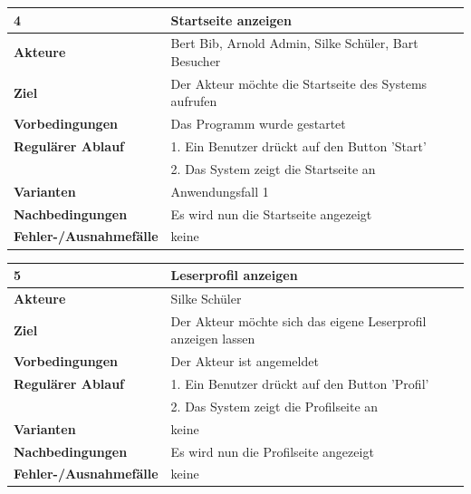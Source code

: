 \documentclass[fontsize=12pt,paper=a4,twoside]{scrartcl}
\begin{document}
\begin{table}[htbp]
\label{4}
\begin{tabular}{|l|p{10cm}|}
\hline 
\textbf{4} & \textbf{Startseite anzeigen} \\ \hline
\textbf{Akteure} & Bert Bib, Arnold Admin, Silke Schüler, Bart Besucher\\ \hline
\textbf{Ziel} & Der Akteur möchte die Startseite des Systems aufrufen  \\ \hline
\textbf{Vorbedingungen} & Das Programm wurde gestartet  \\ \hline
\textbf{Regulärer Ablauf} & 
1. Ein Benutzer drückt auf den Button 'Start' \\
&2. Das System zeigt die Startseite an\\
\hline
\textbf{Varianten} & 
Anwendungsfall 1 \\ \hline
\textbf{Nachbedingungen} & Es wird nun die Startseite angezeigt \\ \hline
\textbf{Fehler-/Ausnahmefälle} & keine\\
\hline
\end{tabular}
\end{table}


\begin{table}[htbp]
\label{5}
\begin{tabular}{|l|p{10cm}|}
\hline 
\textbf{5} & \textbf{Leserprofil anzeigen} \\ \hline
\textbf{Akteure} & Silke Schüler\\ \hline
\textbf{Ziel} & Der Akteur möchte sich das eigene Leserprofil anzeigen lassen  \\ \hline
\textbf{Vorbedingungen} & Der Akteur ist angemeldet  \\ \hline
\textbf{Regulärer Ablauf} & 
1. Ein Benutzer drückt auf den Button 'Profil' \\
&2. Das System zeigt die Profilseite an\\
\hline
\textbf{Varianten} & 
keine \\ \hline
\textbf{Nachbedingungen} & Es wird nun die Profilseite angezeigt \\ \hline
\textbf{Fehler-/Ausnahmefälle} & keine\\
\hline
\end{tabular}
\end{table}
\end{document}
